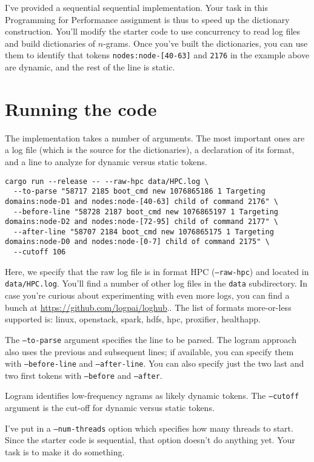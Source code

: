 \documentclass[12pt]{article}
\renewcommand{\_}{\kern-1.5pt\textunderscore\kern-1.5pt}
\begin{document}
I've provided a sequential sequential implementation. Your task in this Programming for Performance assignment is thus to speed up the dictionary construction. You'll modify the starter code to use concurrency to read log files and build dictionaries of $n$-grams. Once you've built the dictionaries, you can use them to identify that tokens \texttt{nodes:node-[40-63]} and \texttt{2176} in the example above are dynamic, and the rest of the line is static.

\section*{Running the code}
The implementation takes a number of arguments. The most important ones are a log file (which is the source for the dictionaries), a declaration of its format, and a line to analyze for dynamic versus static tokens.

{\tiny
\begin{verbatim}
cargo run --release -- --raw-hpc data/HPC.log \
  --to-parse "58717 2185 boot_cmd new 1076865186 1 Targeting domains:node-D1 and nodes:node-[40-63] child of command 2176" \
  --before-line "58728 2187 boot_cmd new 1076865197 1 Targeting domains:node-D2 and nodes:node-[72-95] child of command 2177" \
  --after-line "58707 2184 boot_cmd new 1076865175 1 Targeting domains:node-D0 and nodes:node-[0-7] child of command 2175" \
  --cutoff 106
\end{verbatim}
}

Here, we specify that the raw log file is in format HPC (\texttt{--raw-hpc}) and located in \texttt{data/HPC.log}. You'll find a number of other log files in the \texttt{data} subdirectory. In case you're curious about experimenting with even more logs, you can find a bunch at \url{https://github.com/logpai/loghub}.. The list of formats more-or-less supported is: linux, openstack, spark, hdfs, hpc, proxifier, healthapp.

The \texttt{--to-parse} argument specifies the line to be parsed. The logram approach also uses the previous and subsequent lines; if available, you can specify them with \texttt{--before-line} and \texttt{--after-line}. You can also specify just the two last and two first tokens with \texttt{--before} and \texttt{--after}.

Logram identifies low-frequency ngrams as likely dynamic tokens. The \texttt{--cutoff} argument is the cut-off for dynamic versus static tokens.

I've put in a \texttt{--num-threads} option which specifies how many threads to start. Since the starter code is sequential, that option doesn't do anything yet. Your task is to make it do something.
\end{document}
